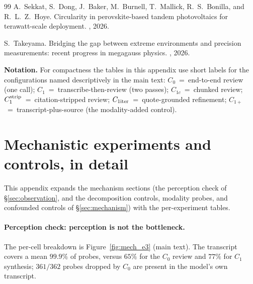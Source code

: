 \documentclass[11pt]{article}
\begin{document}
\begin{thebibliography}{99}
A.~Sekkat, S.~Dong, J.~Baker, M.~Burnell, T.~Mallick, R.~S.~Bonilla, and R.~L.~Z.~Hoye.
\newblock Circularity in perovskite-based tandem photovoltaics for terawatt-scale deployment.
, 2026.

S.~Takeyama.
\newblock Bridging the gap between extreme environments and precision measurements: recent progress in megagauss physics.
, 2026.

\end{thebibliography}

\appendix

\noindent\textbf{Notation.} For compactness the tables in this appendix use short labels for the configurations named descriptively in the main text: $C_0$~=~end-to-end review (one call); $C_1$~=~transcribe-then-review (two passes); $C_{1c}$~=~chunked review; $C_1^{\rm strip}$~=~citation-stripped review; $C_{1\rm iter}$~=~quote-grounded refinement; $C_{1+}$~=~transcript-plus-source (the modality-added control).

\section{Mechanistic experiments and controls, in detail}
\label{appdx:substrate}

This appendix expands the mechanism sections (the perception check of \S\ref{sec:observation}, and the decomposition controls, modality probes, and confounded controls of \S\ref{sec:mechanism}) with the per-experiment tables.

\paragraph{Perception check: perception is not the bottleneck.}
The per-cell breakdown is Figure~\ref{fig:mech_e3} (main text). The transcript covers a mean $99.9\%$ of probes, versus $65\%$ for the $C_0$ review and $77\%$ for $C_1$ synthesis; $361/362$ probes dropped by $C_0$ are present in the model's own transcript.
\end{document}
